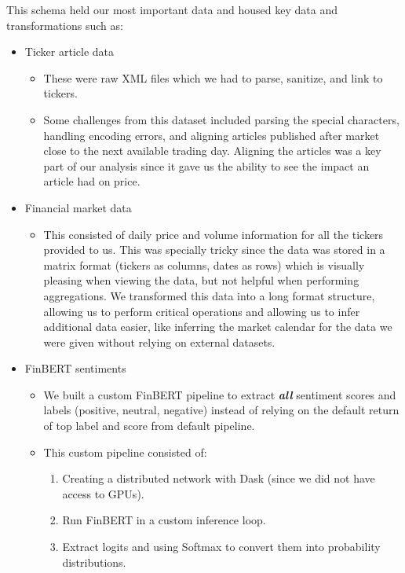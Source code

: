 \documentclass[twocolumn]{article}
\begin{document}
This schema held our most important data and housed key data and transformations such as:
\begin{itemize}
    \item Ticker article data
    \begin{itemize}
        \item These were raw XML files which we had to parse, sanitize, and link to tickers. 
        \item Some challenges from this dataset included parsing the special characters, handling encoding errors, and aligning articles published after market close to the next available trading day. Aligning the articles was a key part of our analysis since it gave us the ability to see the impact an article had on price.
    \end{itemize}
    \item Financial market data 
    \begin{itemize}
        \item This consisted of daily price and volume information for all the tickers provided to us. This was specially tricky since the data was stored in a matrix format (tickers as columns, dates as rows) which is visually pleasing when viewing the data, but not helpful when performing aggregations. We transformed this data into a long format structure, allowing us to perform critical operations and allowing us to infer additional data easier, like inferring the market calendar for the data we were given without relying on external datasets.
    \end{itemize}
    \item FinBERT sentiments
    \begin{itemize}
        \item We built a custom FinBERT pipeline to extract \textbf{\textit{all}} sentiment scores and labels (positive, neutral, negative) instead of relying on the default return of top label and score from default pipeline.
        \item This custom pipeline consisted of:
        \begin{enumerate}
            \item Creating a distributed network with Dask (since we did not have access to GPUs).
            \item Run FinBERT in a custom inference loop.
            \item Extract logits and using Softmax to convert them into probability distributions. 
        \end{enumerate}

\end{itemize}
\end{itemize}
\end{document}
